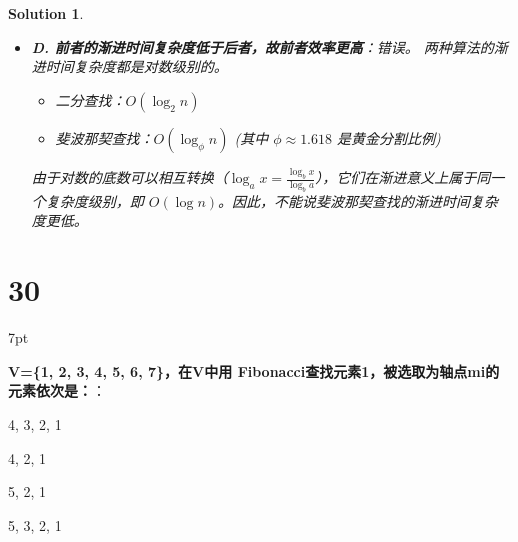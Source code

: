 \documentclass[UTF8]{report}
\newtheorem{solution}{Solution}
\theoremstyle{MyLineTheoremStyle} %
\theoremstyle{MyBlockTheoremStyle} %
\theoremstyle{MySubsubsectionStyle} %
\newenvironment{graybox}{%
        \def\FrameCommand{%
        \hspace{1pt}%
        {\color{gray}\small \vrule width 2pt}%
        {\color{graybox_color}\vrule width 4pt}%
        \colorbox{graybox_color}%
        }%
        \MakeFramed{\advance\hsize-\width\FrameRestore}%
        \noindent\hspace{-4.55pt}%
        \begin{adjustwidth}{}{7pt}%
        \vspace{2pt}\vspace{2pt}%
        }
        {%
        \vspace{2pt}\end{adjustwidth}\endMakeFramed%
        }
\begin{document}
\begin{solution}
\begin{itemize}
    \item \textbf{D. 前者的渐进时间复杂度低于后者，故前者效率更高}：错误。
    两种算法的渐进时间复杂度都是对数级别的。
    \begin{itemize}
        \item 二分查找：$O(\log_2 n)$
        \item 斐波那契查找：$O(\log_{\phi} n)$ (其中 $\phi \approx 1.618$ 是黄金分割比例)
    \end{itemize}
    由于对数的底数可以相互转换（$\log_a x = \frac{\log_b x}{\log_b a}$），它们在渐进意义上属于同一个复杂度级别，即 $O(\log n)$。因此，不能说斐波那契查找的渐进时间复杂度更低。
\end{itemize}
\end{solution}

\section*{30}

\begin{graybox}
\textbf{V=\{1, 2, 3, 4, 5, 6, 7\}，在V中用 Fibonacci查找元素1，被选取为轴点mi的元素依次是：}：
\begin{circledenum}
    \item 4, 3, 2, 1
    \item 4, 2, 1
    \item 5, 2, 1
    \item 5, 3, 2, 1
\end{circledenum}
\end{graybox}
\end{document}
